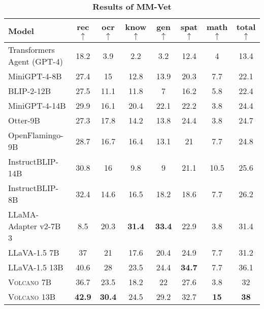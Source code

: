 \documentclass[11pt]{article}
\newcommand{\Ours}{\textsc{Volcano}}
\begin{document}
\begin{table*}[t]
\centering
\begin{tabular}{lcccccc|c}
\toprule
Model & rec $\uparrow$ & ocr $\uparrow$& know $\uparrow$& gen $\uparrow$& spat $\uparrow$& math $\uparrow$& total $\uparrow$\\
\midrule
Transformers Agent (GPT-4)	& 18.2 & 3.9 & 2.2&	3.2	&12.4	&4&	13.4 \\
MiniGPT-4-8B&	27.4&	15&	12.8&	13.9	&20.3&	7.7&	22.1 \\
BLIP-2-12B	&27.5&	11.1	&11.8&	7&	16.2&	5.8	&22.4 \\
MiniGPT-4-14B&	29.9&	16.1&	20.4&	22.1&	22.2&	3.8&	24.4 \\
Otter-9B	&27.3&	17.8	&14.2&	13.8&	24.4&	3.8&	24.7 \\
OpenFlamingo-9B&	28.7&	16.7	&16.4	&13.1	&21	&7.7	&24.8 \\
InstructBLIP-14B&	30.8	&16	&9.8	&9	&21.1	&10.5	&25.6 \\
InstructBLIP-8B	&32.4	&14.6	&16.5	&18.2	&18.6	&7.7	&26.2 \\
LLaMA-Adapter v2-7B	3&8.5	&20.3	&\textbf{31.4}	&\textbf{33.4}	&22.9	&3.8	&31.4 \\
\midrule
LLaVA-1.5 7B	&37	&21	&17.6&	20.4&	24.9	&7.7&	31.2 \\
LLaVA-1.5 13B	&40.6	&28	&23.5	&24.4	&\textbf{34.7}	&7.7	&36.1 \\
{\Ours} 7B	&36.7	&23.5	&18.2	&22	&27.6	&3.8	&32 \\
{\Ours} 13B	&\textbf{42.9}	&\textbf{30.4}	&24.5	&29.2	&32.7	&\textbf{15}	&\textbf{38} \\
\bottomrule
\end{tabular}
\caption{\textbf{Results of MM-Vet}}
\label{tab:Table8}
\end{table*}
\end{document}
